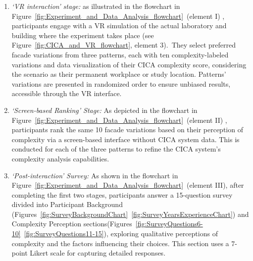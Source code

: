 \begin{enumerate}
    \item \textit{`VR interaction' stage:}  as illustrated in the flowchart in Figure~\ref{fig:Experiment_and_Data_Analysis_flowchart}~(element I) , participants engage with a VR simulation of the actual laboratory and building where the experiment takes place  (see Figure~\ref{fig:CICA_and_VR_flowchart}, element 3).~They select preferred facade variations from three patterns, each with ten complexity-labeled variations  and data visualization of their CICA complexity score, considering the scenario as their permanent workplace or study location.
    Patterns' variations are presented in randomized order to ensure unbiased results, accessible through the VR interface.

    \item \textit{`Screen-based Ranking' Stage:} As depicted in the flowchart in Figure~\ref{fig:Experiment_and_Data_Analysis_flowchart}~(element II) , participants rank the same 10 facade variations based on their perception of complexity via a screen-based interface without CICA system data.
    This is conducted for each of the three patterns to refine the CICA system's complexity analysis capabilities.

    \item \textit{`Post-interaction' Survey:} As shown in the flowchart in Figure~\ref{fig:Experiment_and_Data_Analysis_flowchart}~(element III), after completing the first two stages, participants answer a 15-question survey divided into Participant Background (Figures~\ref{fig:SurveyBackgroundChart}~\ref{fig:SurveyYearsExperienceChart}) and Complexity Perception sections(Figures~\ref{fig:SurveyQuestions6-10}~\ref{fig:SurveyQuestions11-15}), exploring qualitative perceptions of complexity and the factors influencing their choices.
    This section uses a 7-point Likert scale for capturing detailed responses.
\end{enumerate}


